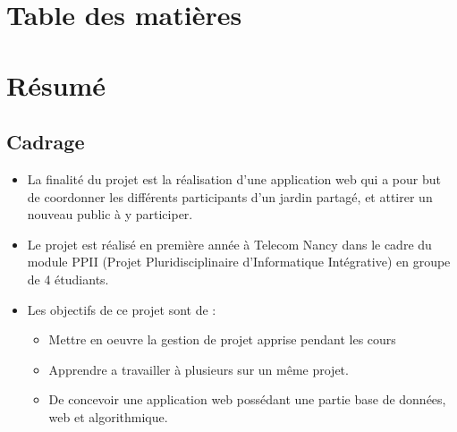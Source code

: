 \documentclass{report}
\begin{document}
\newpage



\section{Table des matières}

\section*{Résumé}
\subsection*{Cadrage}
\begin{itemize}
    \item La finalité du projet est la réalisation d'une application web qui a pour but de coordonner les différents participants d'un jardin partagé, et attirer un nouveau public à y participer.
    \item Le projet est réalisé en première année à Telecom Nancy dans le cadre du module PPII (Projet Pluridisciplinaire d'Informatique Intégrative) en groupe de 4 étudiants.
    \item Les objectifs de ce projet sont de :  
    \begin{itemize}
        \item Mettre en oeuvre la gestion de projet apprise pendant les cours
        \item Apprendre a travailler à plusieurs sur un même projet.
        \item De concevoir une application web possédant une partie base de données, web et algorithmique.
    \end{itemize}
\end{itemize}
\end{document}
